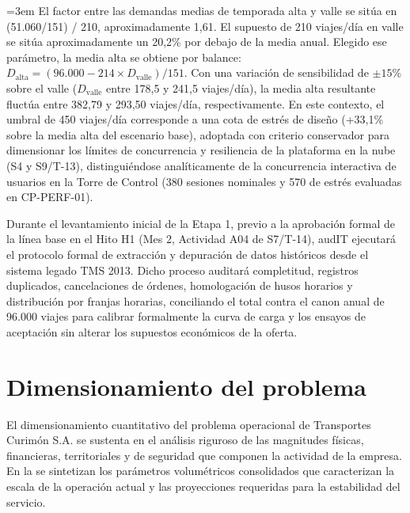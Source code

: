 \begingroup\emergencystretch=3em
El factor entre las demandas medias de temporada alta y valle se sitúa en (51.060/151) / 210, aproximadamente 1,61. El supuesto de 210 viajes/día en valle se sitúa aproximadamente un 20,2\% por debajo de la media anual. Elegido ese parámetro, la media alta se obtiene por balance: \(D_{\text{alta}} = (96.000 - 214 \times D_{\text{valle}}) / 151\). Con una variación de sensibilidad de \(\pm15\%\) sobre el valle (\(D_{\text{valle}}\) entre 178,5 y 241,5 viajes/día), la media alta resultante fluctúa entre 382,79 y 293,50 viajes/día, respectivamente. En este contexto, el umbral de 450 viajes/día corresponde a una cota de estrés de diseño (+33,1\% sobre la media alta del escenario base), adoptada con criterio conservador para dimensionar los límites de concurrencia y resiliencia de la plataforma en la nube (S4 y S9/T-13), distinguiéndose analíticamente de la concurrencia interactiva de usuarios en la Torre de Control (380 sesiones nominales y 570 de estrés evaluadas en CP-PERF-01).

Durante el levantamiento inicial de la Etapa 1, previo a la aprobación formal de la línea base en el Hito H1 (Mes 2, Actividad A04 de S7/T-14), audIT ejecutará el protocolo formal de extracción y depuración de datos históricos desde el sistema legado TMS 2013. Dicho proceso auditará completitud, registros duplicados, cancelaciones de órdenes, homologación de husos horarios y distribución por franjas horarias, conciliando el total contra el canon anual de 96.000 viajes para calibrar formalmente la curva de carga y los ensayos de aceptación sin alterar los supuestos económicos de la oferta.\par\endgroup

\clearpage
\section{Dimensionamiento del problema}\label{sec:2-dimensionamiento}

El dimensionamiento cuantitativo del problema operacional de Transportes Curimón S.A. se sustenta en el análisis riguroso de las magnitudes físicas, financieras, territoriales y de seguridad que componen la actividad de la empresa. En la  se sintetizan los parámetros volumétricos consolidados que caracterizan la escala de la operación actual y las proyecciones requeridas para la estabilidad del servicio.


